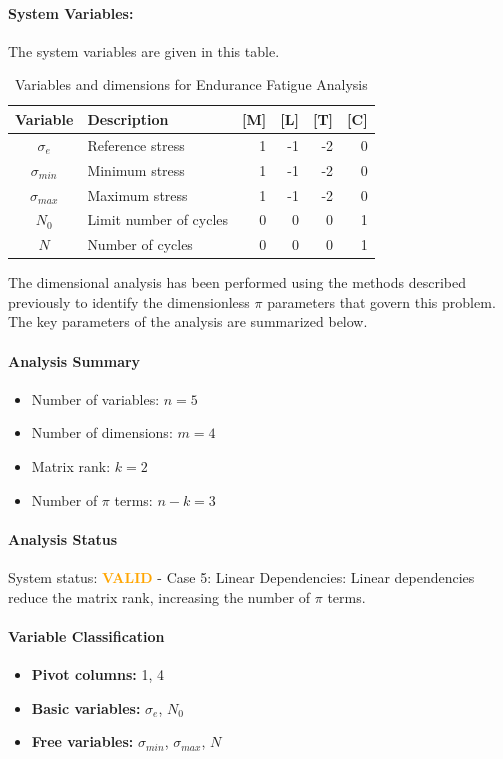 \paragraph{System Variables: } The system variables are given in this table.

\begin{table}[H]
\centering
\begin{tabular}{|c|l|r|r|r|r|}
\hline
\textbf{Variable} & \textbf{Description} & \textbf{[M]} & \textbf{[L]} & \textbf{[T]} & \textbf{[C]} \\
\hline
$\sigma_e$ & Reference stress & 1 & -1 & -2 & 0 \\
$\sigma_{min}$ & Minimum stress & 1 & -1 & -2 & 0 \\
$\sigma_{max}$ & Maximum stress & 1 & -1 & -2 & 0 \\
$N_0$ & Limit number of cycles & 0 & 0 & 0 & 1 \\
$N$ & Number of cycles & 0 & 0 & 0 & 1 \\

\hline
\end{tabular}
\caption{Variables and dimensions for Endurance Fatigue Analysis}
\end{table}

The dimensional analysis has been performed using the methods described previously to identify the dimensionless $\pi$ parameters that govern this problem. The key parameters of the analysis are summarized below.

\paragraph{Analysis Summary}
\begin{itemize}
\item Number of variables: $n = 5$
\item Number of dimensions: $m = 4$
\item Matrix rank: $k = 2$
\item Number of $\pi$ terms: $n - k = 3$
\end{itemize}

\paragraph{Analysis Status}
System status: \textcolor{orange}{\textbf{VALID}} - Case 5: Linear Dependencies: Linear dependencies reduce the matrix rank, increasing the number of $\pi$ terms.


\paragraph{Variable Classification}
\begin{itemize}
\item \textbf{Pivot columns:} 1, 4
\item \textbf{Basic variables:} $\sigma_e$, $N_0$
\item \textbf{Free variables:} $\sigma_{min}$, $\sigma_{max}$, $N$
\end{itemize}

